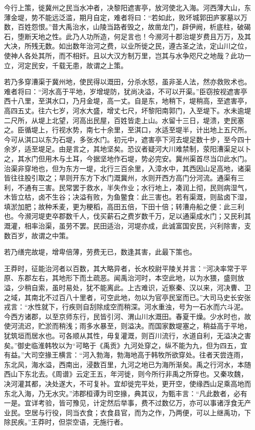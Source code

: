 \documentclass[12pt,UTF8]{ctexbook}
\begin{document}
今行上策，徙冀州之民当水冲者，决黎阳遮害亭，放河使北入海。河西薄大山，东薄金堤，势不能远泛滥，期月自定，难者将曰：“若如此，败坏城郭田庐冢墓以万数，百姓怨恨。”昔大禹治水，山陵当路者毁之，故凿龙门，辟伊阙，析底柱，破碣石，堕断天地之性。此乃人功所造，何足言也！今濒河十郡治堤岁费且万万，及其大决，所残无数。如出数年治河之费，以业所徙之民，遵古圣之法，定山川之位，使神人各处其所，而不相奸。且以大汉方制万里，岂其与水争咫尺之地哉？此功一立，河定民安，千载无患，故谓之上策。



若乃多穿漕渠于冀州地，使民得以溉田，分杀水怒，虽非圣人法，然亦救败术也。难者将曰：“河水高于平地，岁增堤防，犹尚决溢，不可以开渠。”臣窃按视遮害亭西十八里，至淇水口，乃月金堤，高一丈。自是东，地稍下，堤稍高，至遮害亭，高四五丈。往六七岁，河水大盛，增丈七尺，坏黎阳南郭门，入至堤下。水未逾堤二尺所，从堤上北望，河高出民屋，百姓皆走上山。水留十三日，堤溃，吏民塞之。臣循堤上，行视水势，南七十余里，至淇口，水适至堤半，计出地上五尺所。今可从淇口以东为石堤，多张水门。初元中，遮害亭下河去堤足数十步，至今四十余岁，适至堤足。由是言之，其地坚矣。恐议者疑河大川难禁制，荥阳漕渠足以卜之，其水门但用木与土耳，今据坚地作石堤，势必完安。冀州渠首尽当卬此水门。治渠非穿地也，但为东方一堤，北行三百余里，入漳水中，其西因山足高地，诸渠皆往往股引取之；旱则开东方下水门溉冀州，水则开西方高门分河流。通渠有三利，不通有三害。民常罢于救水，半失作业；水行地上，凑润上彻，民则病湿气，木皆立枯，卤不生谷；决溢有败，为鱼鳖食：此三害也。若有渠溉，则盐卤下湿，填淤加肥；故种禾麦，更为粳稻，高田五倍，下田十倍；转漕舟船之便：此三利也。今濒河堤吏卒郡数千人，伐买薪石之费岁数千万，足以通渠成水门；又民利其溉灌，相率治渠，虽劳不罢。民田适治，河堤亦成，此诚富国安民，兴利除害，支数百岁，故谓之中策。



若乃缮完故堤，增卑倍薄，劳费无已，数逢其害，此最下策也。



王莽时，征能治河者以百数，其大略异者，长水校尉平陵关并言：“河决率常于平原、东郡左右，其地形下而土疏恶。闻禹治河时，本空此地，以为水猥，盛则放溢，少稍自索，虽时易处，犹不能离此。上古难识，近察秦、汉以来，河决曹、卫之域，其南北不过百八十里者，可空此地，勿以为官亭民室而已。”大司马史长安张戎言：“水性就下，行疾则自刮除成空而稍深。河水重浊，号为一石水而六斗泥。今西方诸郡，以至京师东行，民皆引河、渭山川水溉田。春夏干燥。少水时也，故使河流迟，贮淤而稍浅；雨多水暴至，则溢决。而国家数堤塞之，稍益高于平地，犹筑垣而居水也。可各顺从其性，毋复灌溉，则百川流行，水道自利，无溢决之害矣。”御史临淮韩牧以为“可略于《禹贡》九河处穿之，纵不能为九，但为四五，宜有益。”大司空掾王横言：“河入勃海，勃海地高于韩牧所欲穿处。往者天尝连雨，东北风，海水溢，西南出，浸数百里，九河之地已为海所渐矣。禹之行河水，本随西山下东北去。《周谱》云定王五，年河徙，则今所行非禹之所穿也。又秦攻魏，决河灌其都，决处遂大，不可复补。宜却徙完平处，更开空，使缘西山足乘高地而东北入海，乃无水灾。”沛郡桓谭为司空掾，典其议，为甄丰言：“凡此数者，必有一是。宜详考验，皆可豫见，计定然后举事，费不过数亿万，亦可以事诸浮食无产业民。空居与行役，同当衣食；衣食县官，而为之作，乃两便，可以上继禹功，下除民疾。”王莽时，但崇空语，无施行者。
\end{document}
